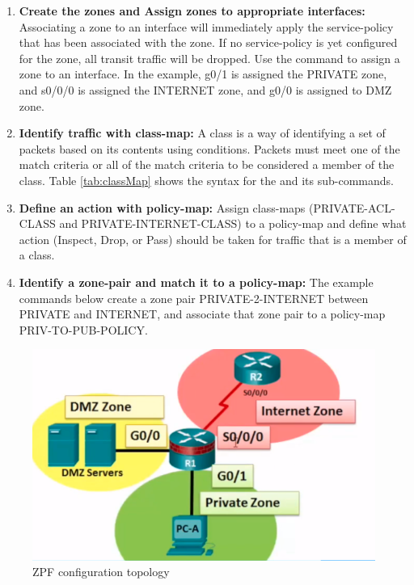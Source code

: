 \begin{enumerate}
\item \textbf{Create the zones and Assign zones to appropriate interfaces:} Associating a zone to an interface will immediately apply the service-policy that has been associated with the zone. If no service-policy is yet configured for the zone, all transit traffic will be dropped. Use the  command to assign a zone to an interface. In the example, g0/1 is assigned the PRIVATE zone, and s0/0/0 is assigned the INTERNET zone, and g0/0 is assigned to DMZ zone.

\item \textbf{Identify traffic with class-map:} A class is a way of identifying a set of packets based on its contents using  conditions. Packets must meet one of the match criteria  or all of the match criteria  to be considered a member of the class. Table \ref{tab:classMap} shows the syntax for the  and its sub-commands.

\item \textbf{Define an action with policy-map:} Assign class-maps (PRIVATE-ACL-CLASS and PRIVATE-INTERNET-CLASS) to a policy-map and define what action (Inspect, Drop, or Pass) should be taken for traffic that is a member of a class. 
\item \textbf{Identify a zone-pair and match it to a policy-map:} The example commands below create a zone pair PRIVATE-2-INTERNET between PRIVATE and INTERNET, and associate that zone pair to a policy-map PRIV-TO-PUB-POLICY.
\end{enumerate}

\begin{figure}[hbtp]
\caption{ZPF configuration topology}\label{Zone}
\centering
\includegraphics[scale=0.5]{pictures/Zone.PNG}
\end{figure}

